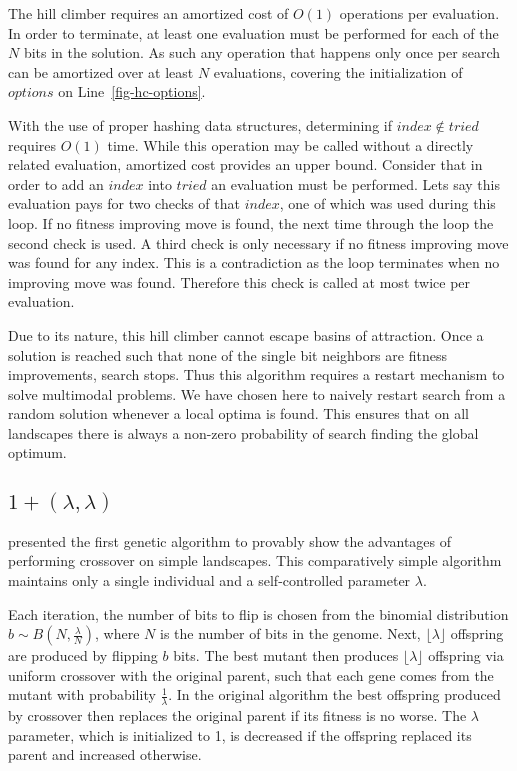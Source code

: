 \documentclass[twoside]{article}
\begin{document}
The hill climber requires an amortized cost of $O(1)$ operations per evaluation. In order to
terminate, at least one evaluation must be performed for each of the $N$ bits in the solution.
As such any operation that happens only once per search can be amortized over at least $N$
evaluations, covering the initialization of $options$ on Line~\ref{fig-hc-options}.

With the use of proper hashing data structures, determining if $index \notin tried$ requires $O(1)$
time. While this operation may be called without a directly related evaluation, amortized cost
provides an upper bound. Consider that in order to add an $index$ into $tried$ an evaluation must
be performed. Lets say this evaluation pays for two checks of that $index$, one of which was used
during this loop. If no fitness improving move is found, the next time through the loop the second check
is used. A third check is only necessary if no fitness improving move was found for any index.
This is a contradiction as the loop terminates when no improving move was found. Therefore this check
is called at most twice per evaluation.

Due to its nature, this hill climber cannot escape basins of attraction. Once a solution is reached
such that none of the single bit neighbors are fitness improvements, search stops. Thus
this algorithm requires a restart mechanism to solve multimodal problems. We have
chosen here to naively restart search from a random solution whenever a local optima is found. This
ensures that on all landscapes there is always a non-zero probability of search finding the global optimum.

\subsection{$1+(\lambda, \lambda)$}
\cite{doerr:2013:lambdalambda} presented the first genetic algorithm to provably show
the advantages of performing crossover on simple landscapes. This comparatively simple
algorithm maintains only a single individual and a self-controlled parameter $\lambda$.

Each iteration, the number of bits to flip is chosen from the binomial distribution $b\sim B(N, \frac{\lambda}{N})$,
where $N$ is the number of bits in the genome.
Next, $\lfloor\lambda\rfloor$ offspring are produced by flipping $b$ bits. The
best mutant then produces $\lfloor\lambda\rfloor$ offspring via uniform crossover with the original parent, such that each gene comes from the
mutant with probability $\frac{1}{\lambda}$. In the original algorithm the best
offspring produced by crossover then replaces the original parent if its fitness is no worse.
The $\lambda$ parameter, which is initialized to 1, is decreased if the offspring replaced
its parent and increased otherwise.
\end{document}
